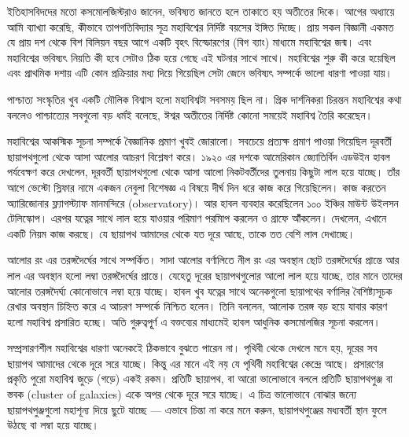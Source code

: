 \documentclass[
]{book}
\begin{document}
ইতিহাসবিদদের মতো কসমোলজিস্টরাও জানেন, ভবিষ্যত জানতে হলে তাকাতে হয় অতীতের দিকে। আগের অধ্যায়ে আমি ব্যাখ্যা করেছি, কীভাবে তাপগতিবিদ্যার সূত্র মহাবিশ্বের নির্দিষ্ট বয়সের ইঙ্গিত দিচ্ছে। প্রায় সকল বিজ্ঞানী একমত যে প্রায় দশ থেকে বিশ বিলিয়ন বছর আগে একটি বৃহৎ বিস্ফোরণের (বিগ ব্যাং) মাধ্যমে মহাবিশ্বের জন্ম। এবং মহাবিশ্বের ভবিষ্যৎ নিয়তি কী হবে সেটাও ঠিক হয়ে গেছে এই ঘটনার সাথে সাথে। মহাবিশ্বের শুরু কী করে হয়েছিল এবং প্রাথমিক দশায় এটি কোন প্রক্রিয়ার মধ্য দিয়ে গিয়েছিল সেটা জেনে ভবিষ্যৎ সম্পর্কে ভালো ধারণা পাওয়া যায়।

পাশ্চাত্য সংস্কৃতির খুব একটি মৌলিক বিশ্বাস হলো মহাবিশ্বটা সবসময় ছিল না। গ্রিক দার্শনিকরা চিরন্তন মহাবিশ্বের কথা বললেও পাশ্চাত্যের সবগুলো বড় ধর্মই বলেছে, ঈশ্বর অতীতের নির্দিষ্ট কোনো সময়েই মহাবিশ্ব তৈরি করেছেন।

মহাবিশ্বের আকস্মিক সূচনা সম্পর্কে বৈজ্ঞানিক প্রমাণ খুবই জোরালো। সবচেয়ে প্রত্যক্ষ প্রমাণ পাওয়া গিয়েছিল দূরবর্তী ছায়াপথগুলো থেকে আসা আলোর আচরণ বিশ্লেষণ করে। ১৯২০ এর দশকে আমেরিকান জ্যোতির্বিদ এডউইন হাবল পর্যবেক্ষণ করে দেখলেন, দূরবর্তী ছায়াপথগুলো থেকে আসা আলো নিকটবর্তীদের তুলনায় কিছুটা লাল হয়ে যাচ্ছে। তাঁর আগে ভেস্টো স্লিফার নামে একজন নেবুলা বিশেষজ্ঞ এ বিষয়ে দীর্ঘ দিন ধরে কাজ করে গিয়েছিলেন। কাজ করতেন অ্যারিজোনার ফ্ল্যাগস্ট্যাফ মানমন্দিরে (observatory)। আর হাবল ব্যবহার করেছিলেন ১০০ ইঞ্চির মাউন্ট উইলসন টেলিস্কোপ। এরপর যত্নের সাথে লাল হয়ে যাওয়ার পরিমাণ পরমািপ করলেন ও গ্রাফে আঁঁকলেন। দেখলেন, এখানে একটি নিয়ম কাজ করছে। যে ছায়াপথ আমাদের থেকে যত দূরে আছে, তাকে তত বেশি লাল দেখাচ্ছে।

আলোর রং এর তরঙ্গদৈর্ঘের সাথে সম্পর্কিত। সাদা আলোর বর্ণালিতে নীল রং এর অবস্থান ছোট তরঙ্গদৈর্ঘের প্রান্তে আর লাল এর অবস্থান হলো লম্বা তরঙ্গদৈর্ঘের প্রান্তে। যেহেতু দূরের ছায়াপথগুলোর আলো লাল হয়ে যাচ্ছে, তার মানে তাদের আলোর তরঙ্গদৈর্ঘ্য কোনোভাবে লম্বা হয়ে যাচ্ছে। হাবল খুব যত্নের সাথে অনেকগুলো ছায়াপথের বর্ণালির বৈশিষ্ট্যসূচক রেখার অবস্থান চিহ্নিত করে এ আচরণ সম্পর্কে নিশ্চিত হলেন। তিনি বললেন, আলোক তরঙ্গ বড় হয়ে যাবার কারণ হলো মহাবিশ্ব প্রসারিত হচ্ছে। অতি গুরুত্বপূূর্ণ এ বক্তব্যের মাধ্যমেই হাবল আধুনিক কসমোলজির সূচনা করলেন।

সম্প্রসারণশীল মহাবিশ্বের ধারণা অনেকইে ঠিকভাবে বুঝতে পারেন না। পৃথিবী থেকে দেখলে মনে হয়, দূরের সব ছায়াপথ আমাদের থেকে দূরে সরে যাচ্ছে। কিন্তু এর মানে এই নয় যে পৃথিবী মহাবিশ্বের কেন্দ্রে আছে। প্রসারণের প্রকৃতি পুরো মহাবিশ্ব জুড়ে (গড়ে) একই রকম। প্রতিটি ছায়াপথ, বা আরো ভালোভাবে বললে প্রতিটি ছায়াপথপুঞ্জ বা স্তবক (cluster of galaxies) একে অপর থেকে দূরে সরে যাচ্ছে। এ চিত্র ভালোভাবে বোঝার জন্যে ছায়াপথপুঞ্জগুলো মহাশূন্য দিয়ে ছুটে যাচ্ছে --- এভাবে চিন্তা না করে মনে করুন, ছায়াপথপুঞ্জের মধ্যবর্তী স্থান ফুলে উঠছে বা লম্বা হয়ে যাচ্ছে।
\end{document}
